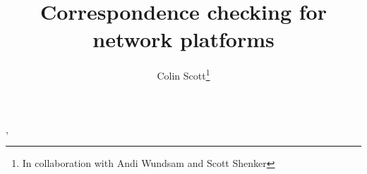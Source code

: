 \documentclass{sig-alternate-10pt}
\title{Correspondence checking for network platforms\vspace{-25pt}}
\author{Colin Scott\thanks{In collaboration with Andi
Wundsam and Scott Shenker}\vspace{-15pt}}
\date{}
\begin{document}
    \maketitle
    \thispagestyle{empty}
%
%
%
%  
\cite{Anteater},\cite{HeaderSpace}

\scriptsize



%
\end{document}
